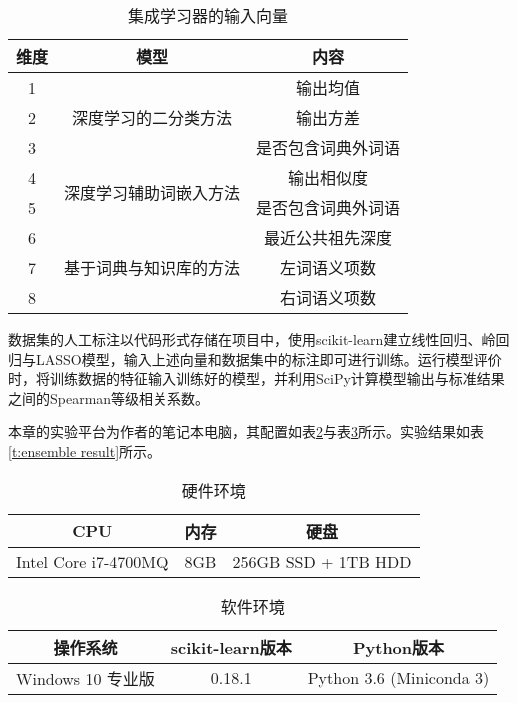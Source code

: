 \begin{table}[h]
	\caption{集成学习器的输入向量}
	\label{t:features}
	\vspace{0.5em}\centering\wuhao
	\begin{tabular}{ccc}
		\toprule[1.5pt]
		维度 & 模型 & 内容 \\
		\midrule[1pt]
		1 & \multirow{3}{*}{深度学习的二分类方法} & 输出均值 \\
		2 &  & 输出方差 \\
		3 &  & 是否包含词典外词语 \\
		\hline
		4 & \multirow{2}{*}{深度学习辅助词嵌入方法} & 输出相似度 \\
		5 &  & 是否包含词典外词语 \\
		\hline
		6 & \multirow{3}{*}{基于词典与知识库的方法} & 最近公共祖先深度 \\
		7 &  & 左词语义项数 \\
		8 &  & 右词语义项数 \\
		\bottomrule[1.5pt]
	\end{tabular}
\end{table}

数据集的人工标注以代码形式存储在项目中，使用scikit-learn建立线性回归、岭回归与LASSO模型，输入上述向量和数据集中的标注即可进行训练。运行模型评价时，将训练数据的特征输入训练好的模型，并利用SciPy计算模型输出与标准结果之间的Spearman等级相关系数。

本章的实验平台为作者的笔记本电脑，其配置如表\ref{t:local hw environment}与表\ref{t:local sw environment}所示。实验结果如表\ref{t:ensemble result}所示。

\begin{table}[h]
	\caption{硬件环境}
	\label{t:local hw environment}
	\vspace{0.5em}\centering\wuhao
	\begin{tabular}{ccc}
		\toprule[1.5pt]
		CPU & 内存 & 硬盘 \\
		\midrule[1pt]
		Intel Core i7-4700MQ & 8GB& 256GB SSD + 1TB HDD \\
		\bottomrule[1.5pt]
	\end{tabular}
\end{table}

\begin{table}[h]
\caption{软件环境}
\label{t:local sw environment}
\vspace{0.5em}\centering\wuhao
\begin{tabular}{ccc}
	\toprule[1.5pt]
	操作系统 & scikit-learn版本 & Python版本 \\
	\midrule[1pt]
	Windows 10 专业版 & 0.18.1 & Python 3.6 (Miniconda 3) \\
	\bottomrule[1.5pt]
\end{tabular}
\end{table}

